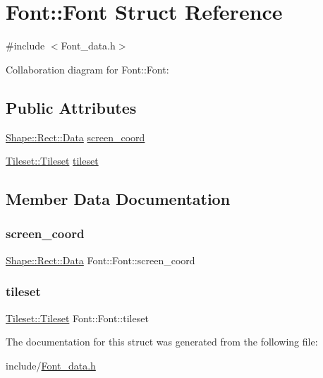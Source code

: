 \hypertarget{struct_font_1_1_font}{}\section{Font\+:\+:Font Struct Reference}
\label{struct_font_1_1_font}


{\ttfamily \#include $<$Font\+\_\+data.\+h$>$}



Collaboration diagram for Font\+:\+:Font\+:
\subsection*{Public Attributes}
\begin{DoxyCompactItemize}
\item 
\mbox{\hyperlink{struct_shape_1_1_rect_1_1_data}{Shape\+::\+Rect\+::\+Data}} \mbox{\hyperlink{struct_font_1_1_font_a8d76b0f00f774be21e7b2c1786c8f5c2}{screen\+\_\+coord}}
\item 
\mbox{\hyperlink{struct_tileset_1_1_tileset}{Tileset\+::\+Tileset}} \mbox{\hyperlink{struct_font_1_1_font_a0646653420a8e6046378340aff202115}{tileset}}
\end{DoxyCompactItemize}


\subsection{Member Data Documentation}
\mbox{\label{struct_font_1_1_font_a8d76b0f00f774be21e7b2c1786c8f5c2}} 
\subsubsection{\texorpdfstring{screen\+\_\+coord}{screen\_coord}}
{\footnotesize\ttfamily \mbox{\hyperlink{struct_shape_1_1_rect_1_1_data}{Shape\+::\+Rect\+::\+Data}} Font\+::\+Font\+::screen\+\_\+coord}

\mbox{\label{struct_font_1_1_font_a0646653420a8e6046378340aff202115}} 
\subsubsection{\texorpdfstring{tileset}{tileset}}
{\footnotesize\ttfamily \mbox{\hyperlink{struct_tileset_1_1_tileset}{Tileset\+::\+Tileset}} Font\+::\+Font\+::tileset}



The documentation for this struct was generated from the following file\+:\begin{DoxyCompactItemize}
\item 
include/\mbox{\hyperlink{_font__data_8h}{Font\+\_\+data.\+h}}\end{DoxyCompactItemize}
